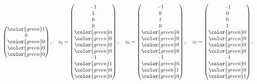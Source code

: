 \begin{loesung}
\[\begin{pmatrix}
\color{green} 1\\
              0\\
\color{green} 0\\
\color{green} 0\\
\color{green} 0
\end{pmatrix}
,\quad
z_5=
\begin{pmatrix}
             -1\\
              1\\
              0\\
              0\\
\color{green} 0\\
\color{green} 0\\
\color{green} 0\\
\color{green} 0\\
             -1\\
\color{green} 1\\
\color{green} 0\\
\color{green} 0
\end{pmatrix}
,\quad
z_6=\begin{pmatrix}
             -1\\
              0\\
              1\\
              0\\
\color{green} 0\\
\color{green} 0\\
\color{green} 0\\
\color{green} 0\\
             -1\\
\color{green} 0\\
\color{green} 1\\
\color{green} 0
\end{pmatrix}
,\quad
z_7=\begin{pmatrix}
             -1\\
              0\\
              0\\
              1\\
\color{green} 0\\
\color{green} 0\\
\color{green} 0\\
\color{green} 0\\
             -1\\
\color{green} 0\\
\color{green} 0\\
\color{green} 1
\end{pmatrix}.
\]
\end{loesung}
